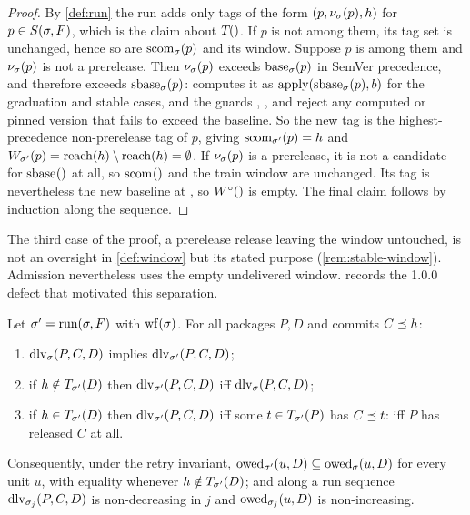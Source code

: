 \begin{proof}
By \cref{def:run} the run adds only tags of the form $(p, \nu_{\sigma}(p),
h)$ for $p \in S(\sigma,F)$, which is the claim about $T_{}()$. If
$p$ is not among them, its tag set is unchanged, hence so are
$\mathrm{scom}_{\sigma}(p)$ and its window. Suppose $p$ is among them and
$\nu_{\sigma}(p)$ is not a prerelease. Then $\nu_{\sigma}(p)$ exceeds
$\mathrm{base}_{\sigma}(p)$ in SemVer precedence, and therefore exceeds
$\mathrm{sbase}_{\sigma}(p)$:  computes it as $\mathrm{apply}(\mathrm{sbase}_{\sigma}(p),b)$
for the graduation and stable cases, and the guards , ,
 and  reject any computed or pinned version that fails to
exceed the baseline. So the new tag is the highest-precedence non-prerelease
tag of $p$, giving $\mathrm{scom}_{\sigma'}(p) = h$ and
$W_{\sigma'}(p) = \mathrm{reach}(h)\setminus\mathrm{reach}(h) = \emptyset$. If
$\nu_{\sigma}(p)$ is a prerelease, it is not a candidate for $\stbase{}$ at all,
so $\stcommit{}$ and the train window are unchanged. Its tag is nevertheless
the new baseline at \Head{}, so $\Winf{}$ is empty. The final claim follows by
induction along the sequence.
\end{proof}

\begin{remark}
The third case of the proof, a prerelease release leaving the window
untouched, is not an oversight in \cref{def:window} but its stated purpose
(\cref{rem:stable-window}). Admission nevertheless uses the empty undelivered window.  records the 1.0.0 defect that motivated this separation.
\end{remark}

\begin{lemma}
\label{lem:deliv}
Let $\sigma' = \mathrm{run}(\sigma,F)$ with $\mathrm{wf}(\sigma)$. For all packages $P, D$ and
commits $C \preceq h$:
\begin{enumerate}[label=(\alph*),leftmargin=2.4em]
  \item $\mathrm{dlv}_{\sigma}(P,C,D)$ implies $\mathrm{dlv}_{\sigma'}(P,C,D)$; \label{dl:mono}
  \item if $h \notin T_{\sigma'}(D)$ then $\mathrm{dlv}_{\sigma'}(P,C,D)$ iff
    $\mathrm{dlv}_{\sigma}(P,C,D)$; \label{dl:unrel}
  \item if $h \in T_{\sigma'}(D)$ then $\mathrm{dlv}_{\sigma'}(P,C,D)$ iff some
    $t \in T_{\sigma'}(P)$ has $C \preceq t$: iff $P$ has released $C$ at all.
    \label{dl:tagged}
\end{enumerate}
Consequently, under the retry invariant, $\mathrm{owed}_{\sigma'}(u,D) \subseteq
\mathrm{owed}_{\sigma}(u,D)$ for every unit $u$, with equality whenever $h \notin
T_{\sigma'}(D)$; and along a run sequence $\mathrm{dlv}_{\sigma_j}(P,C,D)$ is
non-decreasing in $j$ and $\mathrm{owed}_{\sigma_j}(u,D)$ is non-increasing.
\end{lemma}

